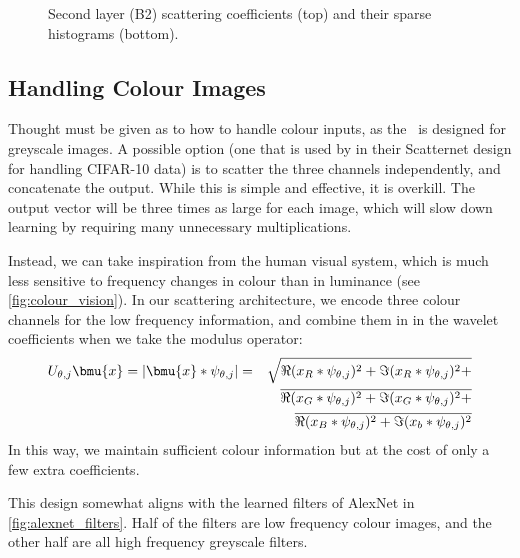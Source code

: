   \begin{figure}
    \centering
    \newline
    \caption[Second layer (B2) scattering coefficients and their histograms]
            {Second layer (B2) scattering coefficients (top) and their sparse
            histograms (bottom).}
    \label{fig:lena_b2_coeffs}
  \end{figure}

\subsection{Handling Colour Images}\label{sec:colour_images}
  Thought must be given as to how to handle colour inputs, as the \DTCWT\ is
  designed for greyscale images. A possible option (one that is used by
  \citeauthor{oyallon_deep_2015} in their Scatternet design for handling CIFAR-10
  data) is to scatter the three channels independently, and concatenate the
  output. While this is simple and effective, it is overkill. The output 
  vector will be three times as large for each image, which will slow down
  learning by requiring many unnecessary multiplications. 

  Instead, we can take inspiration from the human visual system, which is much
  less sensitive to frequency changes in colour than in luminance (see
  \autoref{fig:colour_vision}). In our scattering architecture, we encode
  three colour channels for the low frequency information, and combine them in
  in the wavelet coefficients when we take the modulus operator:
  \begin{eqnarray*}
    U_{\theta, j}\bmu{x} = |\bmu{x} \ast \psi_{\theta, j}| &=&  
      \sqrt{\Re(x_R \ast \psi_{\theta, j})^2 + \Im(x_R \ast \psi_{\theta, j})^2+} \\
    && \overline{ \Re(x_G \ast \psi_{\theta, j})^2 + \Im(x_G \ast
     \psi_{\theta, j})^2 +} \\
    &&  \overline{\Re(x_B \ast \psi_{\theta, j})^2 + \Im(x_b \ast \psi_{\theta, j})^2}
  \end{eqnarray*}
  In this way, we maintain sufficient colour information but at the cost of only a few extra
  coefficients. 

  This design somewhat aligns with the learned filters of AlexNet in
  \autoref{fig:alexnet_filters}. Half of the filters are low frequency colour
  images, and the other half are all high frequency greyscale filters.


